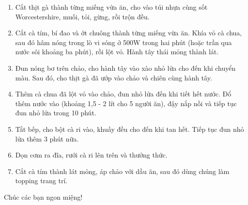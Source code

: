 \documentclass[../main.tex]{subfiles}
\begin{document}
\begin{enumerate}
  \item Cắt thịt gà thành từng miếng vừa ăn, cho vào túi nhựa cùng sốt Worcestershire, muối, tỏi, gừng, rồi trộn đều.
  \item Cắt cà tím, bí đao và ớt chuông thành từng miếng vừa ăn.
        Khía vỏ cà chua, sau đó hâm nóng trong lò vi sóng ở 500W trong hai phút (hoặc trần qua nước sôi khoảng ba phút), rồi lột vỏ.
        Hành tây thái mỏng thành lát.
  \item Đun nóng bơ trên chảo, cho hành tây vào xào nhỏ lửa cho đến khi chuyển màu.
        Sau đó, cho thịt gà đã ướp vào chảo và chiên cùng hành tây.
  \item Thêm cà chua đã lột vỏ vào chảo, đun nhỏ lửa đến khi tiết hết nước.
        Đổ thêm nước vào (khoảng 1,5 - 2 lít cho 5 người ăn), đậy nắp nồi và tiếp tục đun nhỏ lửa trong 10 phút.
  \item Tắt bếp, cho bột cà ri vào, khuấy đều cho đến khi tan hết.
        Tiếp tục đun nhỏ lửa thêm 3 phút nữa.
  \item Dọn cơm ra đĩa, rưới cà ri lên trên và thưởng thức.
  \item Cắt cà tím thành lát mỏng, áp chảo với dầu ăn, sau đó dùng chúng làm topping trang trí.
\end{enumerate}

\begin{center}
  Chúc các bạn ngon miệng!
\end{center}

\end{document}
